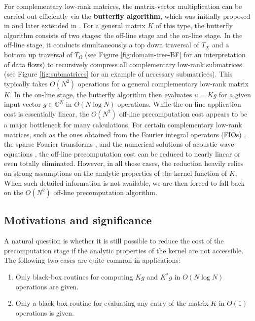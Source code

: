 For complementary low-rank matrices, the matrix-vector multiplication can be carried out efficiently via the {\bf butterfly algorithm}, which was initially proposed in \cite{Butterfly1} and later extended in \cite{Butterfly2}. For a general matrix $K$ of this type, the butterfly algorithm consists of two stages: the off-line stage and the on-line stage. In the off-line stage, it conducts simultaneously a top down traversal of $T_{X}$ and a bottom up traversal of $T_{\Omega}$
(see Figure \ref{fig:domain-tree-BF} for an interpretation of data flows) to recursively compress all complementary low-rank submatrices (see Figure \ref{fig:submatrices} for an example of necessary submatrices).  This typically takes $O(N^2)$ operations \cite{Butterfly2,wavemoth} for a general complementary low-rank matrix $K$. In the on-line stage, the butterfly algorithm then evaluates $u=Kg$ for a given input vector $g\in\mathbb{C}^N$ in $O(N\log N)$ operations. While the on-line application cost is essentially linear, the $O(N^2)$ off-line precomputation cost appears to be a major bottleneck for many calculations. For certain complementary low-rank matrices, such as the ones obtained from the Fourier integral operators ({FIOs}) \cite{FIO09,FIO14,FIO13}, the sparse Fourier transforms \cite{Butterfly5}, and the numerical solutions of acoustic wave equations \cite{FIO12}, the off-line precomputation cost can be reduced to nearly linear or even totally eliminated. However, in all these cases, the reduction heavily relies on strong assumptions on the analytic properties of the kernel function of $K$. When such detailed information is not available, we are then forced to fall back on the $O(N^2)$ off-line precomputation algorithm.

\subsection{Motivations and significance}

A natural question is whether it is still possible to reduce the cost of the precomputation stage if the analytic properties of the kernel are not accessible. The following two cases are quite common in applications:

\begin{enumerate}
\item Only black-box routines for computing $Kg$ and $K^*g$ in
  $O(N\log N)$ operations are given.
\item Only a black-box routine for evaluating any entry of the matrix $K$ in $O(1)$ operations is given.
\end{enumerate}

